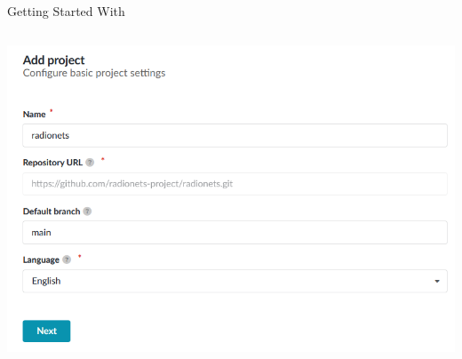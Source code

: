 \begin{frame}[fragile]{Getting Started With \rtd}
\begin{columns}[onlytextwidth]
\begin{column}{0.48\textwidth}
{        \includegraphics[width=\textwidth]{graphics/rtd3.png}
      }
    \end{column}
  \end{columns}
\end{frame}
